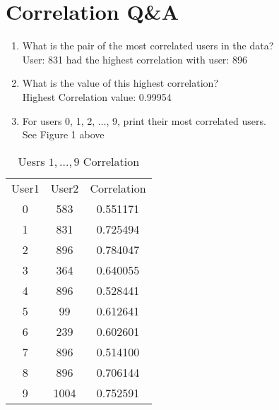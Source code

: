 \documentclass[12pt,twoside]{article}
\begin{document}
\section{Correlation Q\&A}
\begin{enumerate}
    \item What is the pair of the most correlated users in the data? \\
    User: 831 had the highest correlation with user: 896
    \item What is the value of this highest correlation?\\
    Highest Correlation value:  0.99954
    \item For users 0, 1, 2, $\dots$, 9, print their most correlated users.\\ 
    See Figure 1 above
\end{enumerate}
\begin{table}[]
        \centering
        \begin{tabular}{c|c|c}
                User1&  User2&  Correlation \\
                0&    583&     0.551171 \\ 
                1&    831&     0.725494 \\
                2&    896&     0.784047 \\
                3&    364&     0.640055 \\
                4&    896&     0.528441 \\
                5&     99&     0.612641 \\
                 6&    239&     0.602601 \\
                 7&    896&     0.514100 \\
                 8&    896&     0.706144 \\
                 9&   1004&     0.752591 \\
        \end{tabular}
        \caption{Uesrs $1,\dots,9$ Correlation}
        \label{tab:my_label}
    \end{table} 
\end{document}
